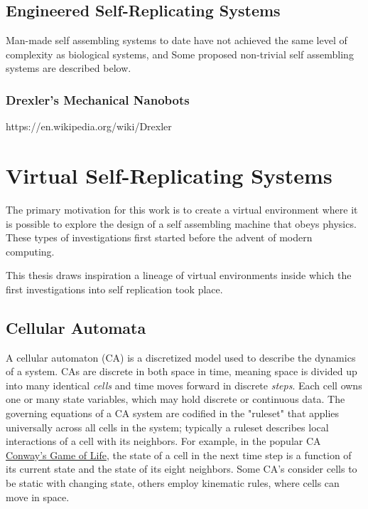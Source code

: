 {\subsection{Engineered Self-Replicating Systems}

Man-made self assembling systems to date have not achieved the same level of complexity as biological systems, and 
Some proposed non-trivial self assembling systems are described below.

\subsubsection{Drexler's Mechanical Nanobots}

https://en.wikipedia.org/wiki/Drexler%

\section{Virtual Self-Replicating Systems}

The primary motivation for this work is to create a virtual environment where it is possible to explore the design of a self assembling machine that obeys physics.  These types of investigations first started before the advent of modern computing.

This thesis draws inspiration a lineage of virtual environments inside which the first investigations into self replication took place.\\

\subsection{Cellular Automata}

A cellular automaton (CA) is a discretized model used to describe the dynamics of a system.  CAs are discrete in both space in time, meaning space is divided up into many identical \textit{cells} and time moves forward in discrete \textit{steps}.  Each cell owns one or many state variables, which may hold discrete or continuous data.  The governing equations of a CA system are codified in the "ruleset" that applies universally across all cells in the system; typically a ruleset describes local interactions of a cell with its neighbors.  For example, in the popular CA \href{https://en.wikipedia.org/wiki/Conway's_Game_of_Life}{Conway's Game of Life}, the state of a cell in the next time step is a function of its current state and the state of its eight neighbors.  Some CA's consider cells to be static with changing state, others employ kinematic rules, where cells can move in space.\\

}
